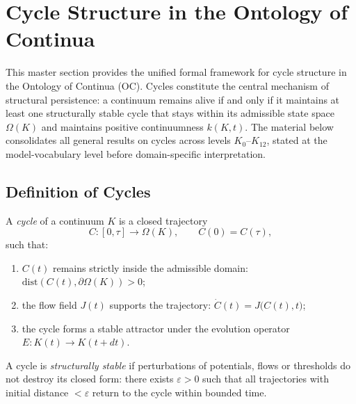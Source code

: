 
\section{Cycle Structure in the Ontology of Continua}
\label{sec:cycles-master}

This master section provides the unified formal framework for cycle
structure in the Ontology of Continua (OC).
Cycles constitute the central mechanism of structural persistence:
a continuum remains alive if and only if it maintains at least one
structurally stable cycle that stays within its admissible state space
\(\Omega(K)\) and maintains positive continuumness \(k(K,t)\).
The material below consolidates all general results on cycles across
levels \(K_0\)–\(K_{12}\), stated at the model-vocabulary level before domain-specific interpretation.

\subsection{Definition of Cycles}

A \emph{cycle} of a continuum \(K\) is a closed trajectory
\[
  C : [0,\tau] \to \Omega(K),
  \qquad
  C(0)=C(\tau),
\]
such that:
\begin{enumerate}
  \item \(C(t)\) remains strictly inside the admissible domain:
        \(\mathrm{dist}(C(t),\partial\Omega(K)) > 0\);
  \item the flow field \(J(t)\) supports the trajectory:
        \(\dot{C}(t) = J\big(C(t),t\big)\);
  \item the cycle forms a stable attractor under the evolution operator
        \(E:K(t)\to K(t+dt)\).
\end{enumerate}

A cycle is \emph{structurally stable} if perturbations of potentials,
flows or thresholds do not destroy its closed form:
there exists \(\varepsilon > 0\) such that all trajectories with
initial distance \(<\varepsilon\) return to the cycle within bounded time.

